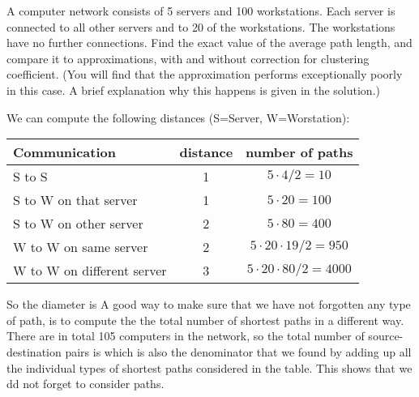 
A computer network consists of 5 servers and 100 workstations. Each server is connected to all other servers and to 20 of the workstations. The workstations have no further connections. Find the exact value of the average path length, and compare it to approximations, with and without correction for clustering coefficient. (You will find that the approximation performs exceptionally poorly in this case. A brief explanation why this happens is given in the solution.)  

\solution
We can compute the following distances (S=Server, W=Worstation):
\begin{center}
\begin{tabular}{l c c}
Communication & distance & number of paths \\\hline
S to S & 1 & $5\cdot 4/2 = 10$ \\
S to W on that server & 1 & $5\cdot 20 = 100$ \\
S to W on other server & 2 & $ 5 \cdot 80 = 400$ \\
W to W on same server & 2 & $5 \cdot 20 \cdot 19 /2 = 950$ \\
W to W on different server & 3 & $5\cdot 20 \cdot 80/2=4000$
\end{tabular}    
\end{center}
So the diameter is 
\eq{
D_{]rm Exact}=\frac{1\cdot (10+100))+2\cdot (400+950) + 3 \cdot 4000}{10+100+400+950+4000}=\frac{14810}{5460}\approx 2.712
}
A good way to make sure that we have not forgotten any type of path, is to compute the the total number of shortest paths in a different way. There are in total 105 computers in the network, so the total number of source-destination pairs is 
which is also the denominator that we found by adding up all the individual types of shortest paths considered in the table. This shows that we dd not forget to consider paths. 

